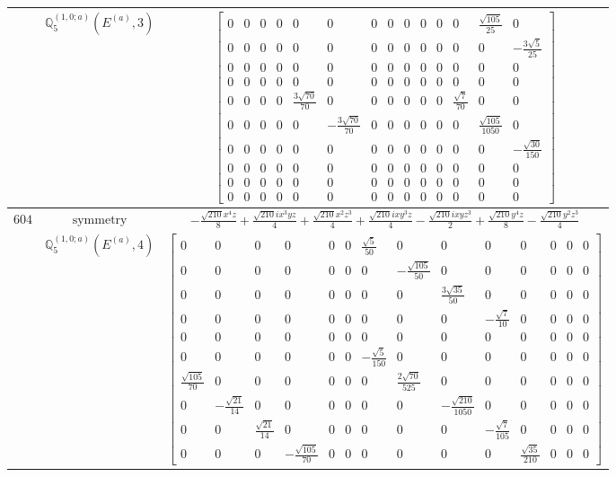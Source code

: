 \documentclass[fleqn,8pt,landscape]{jsarticle}
\begin{document}
\begin{longtable}{ccc}
$  $ & $ \mathbb{Q}_{5}^{(1,0;a)}(E^{(a)},3) $ & $ \begin{bmatrix} 0 & 0 & 0 & 0 & 0 & 0 & 0 & 0 & 0 & 0 & 0 & 0 & \frac{\sqrt{105}}{25} & 0 \\ 0 & 0 & 0 & 0 & 0 & 0 & 0 & 0 & 0 & 0 & 0 & 0 & 0 & - \frac{3 \sqrt{5}}{25} \\ 0 & 0 & 0 & 0 & 0 & 0 & 0 & 0 & 0 & 0 & 0 & 0 & 0 & 0 \\ 0 & 0 & 0 & 0 & 0 & 0 & 0 & 0 & 0 & 0 & 0 & 0 & 0 & 0 \\ 0 & 0 & 0 & 0 & \frac{3 \sqrt{70}}{70} & 0 & 0 & 0 & 0 & 0 & 0 & \frac{\sqrt{7}}{70} & 0 & 0 \\ 0 & 0 & 0 & 0 & 0 & - \frac{3 \sqrt{70}}{70} & 0 & 0 & 0 & 0 & 0 & 0 & \frac{\sqrt{105}}{1050} & 0 \\ 0 & 0 & 0 & 0 & 0 & 0 & 0 & 0 & 0 & 0 & 0 & 0 & 0 & - \frac{\sqrt{30}}{150} \\ 0 & 0 & 0 & 0 & 0 & 0 & 0 & 0 & 0 & 0 & 0 & 0 & 0 & 0 \\ 0 & 0 & 0 & 0 & 0 & 0 & 0 & 0 & 0 & 0 & 0 & 0 & 0 & 0 \\ 0 & 0 & 0 & 0 & 0 & 0 & 0 & 0 & 0 & 0 & 0 & 0 & 0 & 0 \end{bmatrix} $ \\ \hline
$ 604 $ & $ \text{symmetry} $ & $ - \frac{\sqrt{210} x^{4} z}{8} + \frac{\sqrt{210} i x^{3} y z}{4} + \frac{\sqrt{210} x^{2} z^{3}}{4} + \frac{\sqrt{210} i x y^{3} z}{4} - \frac{\sqrt{210} i x y z^{3}}{2} + \frac{\sqrt{210} y^{4} z}{8} - \frac{\sqrt{210} y^{2} z^{3}}{4} $ \\
$  $ & $ \mathbb{Q}_{5}^{(1,0;a)}(E^{(a)},4) $ & $ \begin{bmatrix} 0 & 0 & 0 & 0 & 0 & 0 & \frac{\sqrt{5}}{50} & 0 & 0 & 0 & 0 & 0 & 0 & 0 \\ 0 & 0 & 0 & 0 & 0 & 0 & 0 & - \frac{\sqrt{105}}{50} & 0 & 0 & 0 & 0 & 0 & 0 \\ 0 & 0 & 0 & 0 & 0 & 0 & 0 & 0 & \frac{3 \sqrt{35}}{50} & 0 & 0 & 0 & 0 & 0 \\ 0 & 0 & 0 & 0 & 0 & 0 & 0 & 0 & 0 & - \frac{\sqrt{7}}{10} & 0 & 0 & 0 & 0 \\ 0 & 0 & 0 & 0 & 0 & 0 & 0 & 0 & 0 & 0 & 0 & 0 & 0 & 0 \\ 0 & 0 & 0 & 0 & 0 & 0 & - \frac{\sqrt{5}}{150} & 0 & 0 & 0 & 0 & 0 & 0 & 0 \\ \frac{\sqrt{105}}{70} & 0 & 0 & 0 & 0 & 0 & 0 & \frac{2 \sqrt{70}}{525} & 0 & 0 & 0 & 0 & 0 & 0 \\ 0 & - \frac{\sqrt{21}}{14} & 0 & 0 & 0 & 0 & 0 & 0 & - \frac{\sqrt{210}}{1050} & 0 & 0 & 0 & 0 & 0 \\ 0 & 0 & \frac{\sqrt{21}}{14} & 0 & 0 & 0 & 0 & 0 & 0 & - \frac{\sqrt{7}}{105} & 0 & 0 & 0 & 0 \\ 0 & 0 & 0 & - \frac{\sqrt{105}}{70} & 0 & 0 & 0 & 0 & 0 & 0 & \frac{\sqrt{35}}{210} & 0 & 0 & 0 \end{bmatrix} $ \\ \hline

\end{longtable}
\end{document}
